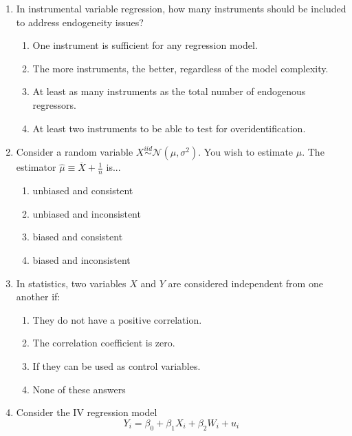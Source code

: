 \documentclass{article}
\begin{document}
\parindent

\begin{enumerate}

    \item In instrumental variable regression, how many instruments should be included to address endogeneity issues?
    \begin{enumerate}[label=\alph*)]
        \item One instrument is sufficient for any regression model.
        \item The more instruments, the better, regardless of the model complexity.
        \item At least as many instruments as the total number of endogenous regressors.
        \item At least two instruments to be able to test for overidentification.
    \end{enumerate}\vspace{.25cm}
\item Consider a random variable $X\stackrel{iid}{\sim}\mathcal{N}(\mu, \sigma^2)$. You wish to estimate $\mu$. The estimator $\hat{\mu}\equiv \overline{X} + \frac{1}{n} $ is...

\begin{enumerate}[label=\alph*)]
\item unbiased and consistent
\item unbiased and inconsistent
\item biased and consistent
\item biased and inconsistent
\end{enumerate}\vspace{.25cm}

\item In statistics, two variables \(X\) and \(Y\) are considered independent from one another if:
    \begin{enumerate}[label=\alph*)]
        \item They do not have a positive correlation.
        \item The correlation coefficient is zero.
        \item If they can be used as control variables.
        \item None of these answers
    \end{enumerate}\vspace{.25cm}

\item Consider the IV regression model
\begin{equation*}
    Y_i = \beta_0 + \beta_1 X_i + \beta_2 W_i + u_i
\end{equation*}


\end{enumerate}
\end{document}
